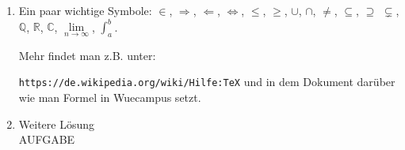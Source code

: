 \documentclass[a4paper,abstract,german]{scrreprt}
\newcommand{\Q}{\mathbb{Q}}
\newcommand{\R}{\mathbb{R}}
\newcommand{\C}{\mathbb{C}}
\begin{document}
\begin{enumerate}
	\item[\textbf {H1.2}]
	
	Ein paar wichtige Symbole: $\in$, $\Rightarrow$, $\Leftarrow$, $\Leftrightarrow$, $\leq$, $\geq$, $\cup$, $\cap$, $\neq$, $\subseteq$, $\supseteq$ $\subsetneq$, $\Q$, $\R$, $\C$, $\lim\limits_{n \to \infty}$, $\int_{a}^{b}$.
	
	Mehr findet man z.B. unter:
	
	\verb|https://de.wikipedia.org/wiki/Hilfe:TeX|
	und in dem Dokument darüber wie man Formel in Wuecampus setzt.
	
	\item[\textbf {H1.3}]
	Weitere Lösung\\
	
	AUFGABE
	
\end{enumerate}
\end{document}
